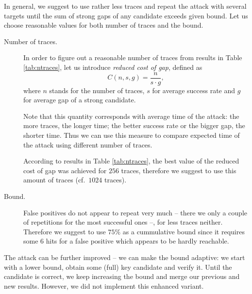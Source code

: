 In general, we suggest to use rather less traces and repeat the attack with several targets until the sum of strong gaps of any candidate exceeds given bound. Let us choose reasonable values for both number of traces and the bound.
\begin{description}
	\item[Number of traces.]
		In order to figure out a reasonable number of traces from results in Table \ref{tab:ntraces}, let us introduce {\em reduced cost of gap}, defined as
		\begin{equation}
		\label{eq:redcost}
			C(n, s, g) = \frac{n}{s\cdot g} ,
		\end{equation}
		where $n$ stands for the number of traces, $s$ for average success rate and $g$ for average gap of a strong candidate.
		
		Note that this quantity corresponds with average time of the attack: the more traces, the longer time; the better success rate or the bigger gap, the shorter time. Thus we can use this measure to compare expected time of the attack using different number of traces.
		
		According to results in Table \ref{tab:ntraces}, the best value of the reduced cost of gap was achieved for $256$ traces, therefore we suggest to use this amount of traces (cf.\ $1024$ traces).
	\item[Bound.]
		False positives do not appear to repeat very much -- there we only a couple of repetitions for the most successful ones --, for less traces neither. Therefore we suggest to use $75\%$ as a cummulative bound since it requires some $6$ hits for a false positive which appears to be hardly reachable.
\end{description}

The attack can be further improved -- we can make the bound adaptive: we start with a lower bound, obtain some (full) key candidate and verify it. Until the candidate is correct, we keep increasing the bound and merge our previous and new results. However, we did not implement this enhanced variant.

